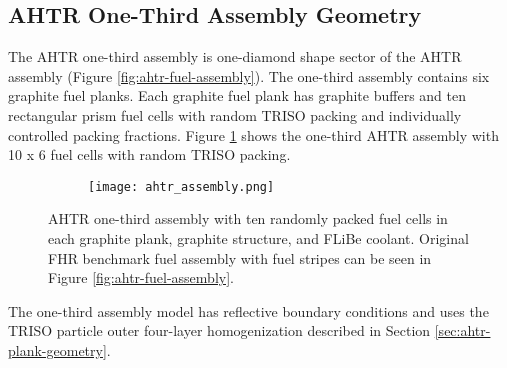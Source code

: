 \subsection{AHTR One-Third Assembly Geometry}
\label{sec:ahtr-assem-geometry}
The \gls{AHTR} one-third assembly is one-diamond shape sector of the \gls{AHTR} assembly
(Figure \ref{fig:ahtr-fuel-assembly}). 
The one-third assembly contains six graphite fuel planks.
Each graphite fuel plank has graphite buffers and ten rectangular prism fuel cells 
with random TRISO packing and individually controlled packing fractions. 
Figure \ref{fig:ahtr_assembly} shows the one-third \gls{AHTR} assembly with 10 x 6 
fuel cells with random \gls{TRISO} packing.
\begin{figure}[htbp]
    \centering
    \begin{subfigure}{.7\textwidth}
    \texttt{[image: ahtr\_assembly.png]}
    \end{subfigure}%
    \begin{subfigure}{.3\textwidth}
        \vspace{1cm}
    \end{subfigure}
    \caption{\acrfull{AHTR} one-third assembly with ten randomly packed fuel cells 
    in each graphite plank, graphite structure, and \gls{FLiBe} coolant. 
    Original \gls{FHR} benchmark fuel assembly with fuel 
    stripes can be seen in Figure \ref{fig:ahtr-fuel-assembly}.}
    \label{fig:ahtr_assembly}
\end{figure}
The one-third assembly model has reflective boundary conditions and  
uses the \gls{TRISO} particle outer four-layer 
homogenization described in Section \ref{sec:ahtr-plank-geometry}.

